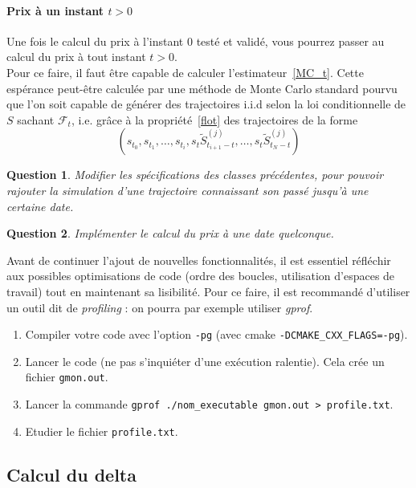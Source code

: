 \documentclass[a4paper,11pt]{article}
\def\cf{{\mathcal F}}
\newtheorem{question}{Question}
\begin{document}
\paragraph{Prix à un instant $t > 0$}

Une fois le calcul du prix à l'instant $0$ testé et validé, vous pourrez passer au calcul du prix à tout instant $t > 0$. \\

Pour ce faire, il faut être capable de calculer l'estimateur~\eqref{MC_t}.  Cette espérance peut-être calculée par une méthode de Monte Carlo standard pourvu que l'on soit capable de générer des trajectoires i.i.d selon la loi conditionnelle de $S$ sachant $\cf_t$, i.e. grâce à la propriété~\eqref{flot} des trajectoires de la forme
\begin{equation*}
(s_{t_0}, s_{t_1}, \dots, s_{t_i}, s_t \tilde S_{t_{i+1} - t}^{(j)}, \dots,  s_t \tilde S_{t_N - t}^{(j)})
\end{equation*}

\begin{question}
  Modifier les spécifications des classes précédentes, pour pouvoir rajouter la simulation d'une trajectoire connaissant son passé jusqu'à une certaine date.
\end{question}

\begin{question}
  Implémenter le calcul du prix à une date quelconque.
\end{question}


Avant de continuer l'ajout de nouvelles fonctionnalités, il est essentiel réfléchir aux possibles optimisations de code (ordre des boucles, utilisation d'espaces de travail) tout en maintenant sa lisibilité. Pour ce faire, il est recommandé d'utiliser un outil dit de
\emph{profiling} : on pourra par exemple utiliser \emph{gprof}.
\begin{enumerate}
  \item Compiler votre code avec l'option \verb!-pg! (avec cmake \verb!-DCMAKE_CXX_FLAGS=-pg!).
  \item Lancer le code (ne pas s'inquiéter d'une exécution ralentie). Cela crée un fichier
    \texttt{gmon.out}.
  \item Lancer la commande \texttt{gprof ./nom\_executable gmon.out > profile.txt}.
  \item Etudier le fichier \texttt{profile.txt}.
\end{enumerate}


\subsection{Calcul du delta}
\end{document}
